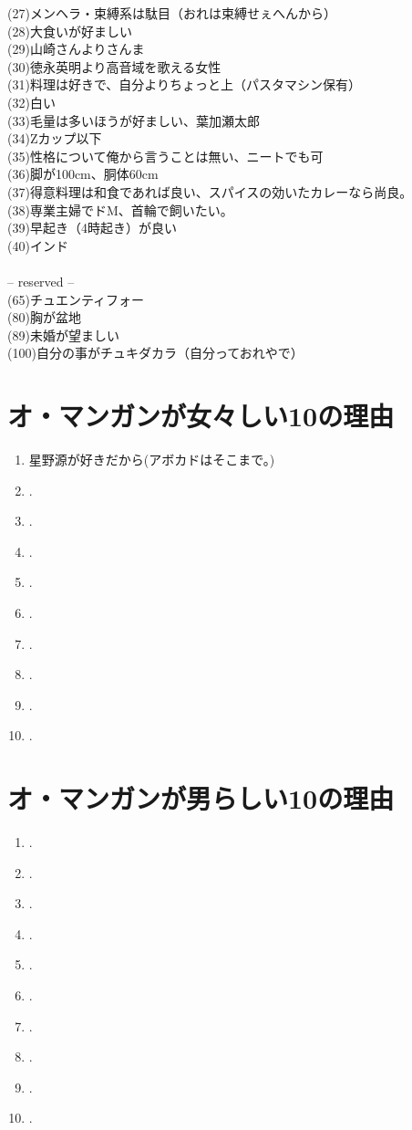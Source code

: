 (27)メンヘラ・束縛系は駄目（おれは束縛せぇへんから）\\
(28)大食いが好ましい\\
(29)山崎さんよりさんま\\
(30)徳永英明より高音域を歌える女性\\
(31)料理は好きで、自分よりちょっと上（パスタマシン保有）\\
(32)白い\\
(33)毛量は多いほうが好ましい、葉加瀬太郎\\
(34)Zカップ以下\\
(35)性格について俺から言うことは無い、ニートでも可\\
(36)脚が100cm、胴体60cm\\
(37)得意料理は和食であれば良い、スパイスの効いたカレーなら尚良。\\
(38)専業主婦でドM、首輪で飼いたい。\\
(39)早起き（4時起き）が良い\\
(40)インド\\
\\
-- reserved --\\ 
(65)チュエンティフォー\\
(80)胸が盆地\\
(89)未婚が望ましい\\
(100)自分の事がチュキダカラ（自分っておれやで）\\

\newpage
\section{オ・マンガンが女々しい10の理由}
\begin{enumerate}
\item 星野源が好きだから(アボカドはそこまで。)
\item .
\item .
\item .
\item .
\item .
\item .
\item .
\item .
\item .
\end{enumerate}


\section{オ・マンガンが男らしい10の理由}
\begin{enumerate}
\item .
\item .
\item .
\item .
\item .
\item .
\item .
\item .
\item .
\item .
\end{enumerate}

